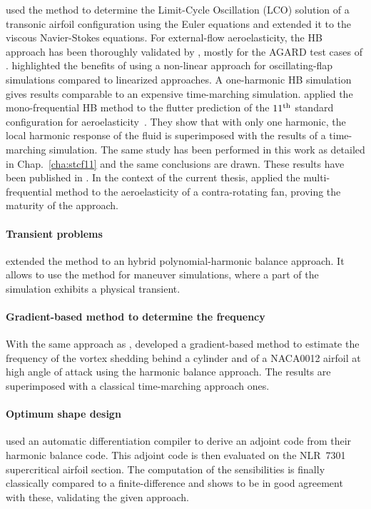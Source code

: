 \citet{Thomas2002a} used the method to
determine the Limit-Cycle Oscillation (LCO) solution
of a transonic airfoil configuration using the
Euler equations and \citet{Thomas2004b} extended
it to the viscous Navier-Stokes equations.
For external-flow aeroelasticity, the HB approach has 
been thoroughly 
validated by \citet{Gopinath2005, JSicot2008, Woodgate2009, JDufour2009}, 
mostly for the AGARD test cases of \citet{Davis1982}. 
\citet{JDufour2009} highlighted the benefits of using a 
non-linear approach for oscillating-flap simulations
compared to linearized approaches. A one-harmonic HB simulation
gives results comparable to an expensive time-marching simulation.
\citet{Huang2013} applied the mono-frequential
HB method to the flutter prediction of the 
$11\textsuperscript{th}$ 
standard configuration for aeroelasticity~\cite{Fransson1999}.
They show that with only one harmonic, the local
harmonic response of the fluid is superimposed
with the results of a time-marching simulation.
The same study has been performed in this work
as detailed in Chap.~\ref{cha:stcf11}
and the same conclusions are drawn. These results have been
published in \citet{JSicot2012}.
In the context of the current thesis,
\citet{JSicot2013} applied the multi-frequential method to the
aeroelasticity of a contra-rotating fan, proving
the maturity of the approach.


\paragraph{Transient problems}
\citet{Mavriplis2012} extended the method to 
an hybrid polynomial-harmonic balance approach. 
It allows to use the method for maneuver simulations, 
where a part of the simulation exhibits a physical transient.

\paragraph{Gradient-based method to determine the frequency}
With the same approach as \citet{McMullen2002}, \citet{Gopinath2006}
developed a gradient-based method to estimate the frequency of the 
vortex shedding behind a cylinder and of a NACA0012 airfoil 
at high angle of attack using the harmonic balance approach.
The results are superimposed with a classical time-marching approach ones.

\paragraph{Optimum shape design}
\citet{Thomas2005b} used an automatic 
differentiation compiler to derive an adjoint code
from their harmonic balance code. This adjoint code is then
evaluated on the NLR~7301 supercritical airfoil section.
The computation of the sensibilities is finally
classically compared to a finite-difference and shows
to be in good agreement with these, validating
the given approach.

